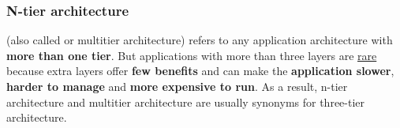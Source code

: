 \subsubsection{N-tier architecture}

 (also called or multitier architecture) refers to any application architecture with \textbf{more than one tier}. But applications with more than three layers are \underline{rare} because extra layers offer \textbf{few benefits} and can make the \textbf{application slower}, \textbf{harder to manage} and \textbf{more expensive to run}. As a result, n-tier architecture and multitier architecture are usually synonyms for three-tier architecture.